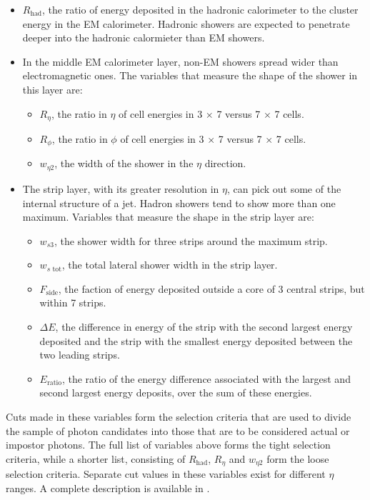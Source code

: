 \begin{itemize}
\item $R_\text{had}$, the ratio of energy deposited in the hadronic calorimeter to the cluster energy in the EM calorimeter. Hadronic showers are expected to penetrate deeper into the hadronic calormieter than EM showers.
\item In the middle EM calorimeter layer, non-EM showers spread wider than electromagnetic ones. The variables that measure the shape of the shower in this layer are:
\begin{itemize}
\item $R_\eta$, the ratio in $\eta$ of cell energies in 3 $\times$ 7 versus 7 $\times$ 7 cells.
\item $R_\phi$, the ratio in $\phi$ of cell energies in 3 $\times$ 7 versus 7 $\times$ 7 cells.
\item $w_{\eta 2}$, the width of the shower in the $\eta$ direction.
\end{itemize}
\item The strip layer, with its greater resolution in $\eta$, can pick out some of the internal structure of a jet. Hadron showers tend to show more than one maximum. Variables that measure the shape in the strip layer are:
\begin{itemize}
\item $w_{s3}$, the shower width for three strips around the maximum strip.
\item $w_{s\text{ tot}}$, the total lateral shower width in the strip layer.
\item $F_\text{side}$, the faction of energy deposited outside a core of 3 central strips, but within 7 strips.
\item $\Delta E$, the difference in energy of the strip with the second largest energy deposited and the strip with the smallest energy deposited between the two leading strips.
\item $E_\text{ratio}$, the ratio of the energy difference associated with the
largest and second largest energy deposits, over the sum of these energies.
\end{itemize}
\end{itemize}

Cuts made in these variables form the selection criteria that are used to divide the sample of photon candidates into those that are to be considered actual or impostor photons. The full list of variables above forms the tight selection criteria, while a shorter list, consisting of $R_\text{had}$, $R_\eta$ and $w_{\eta2}$ form the loose selection criteria. Separate cut values in these variables exist for different $\eta$ ranges. A complete description is available in \cite{Carminati}.

